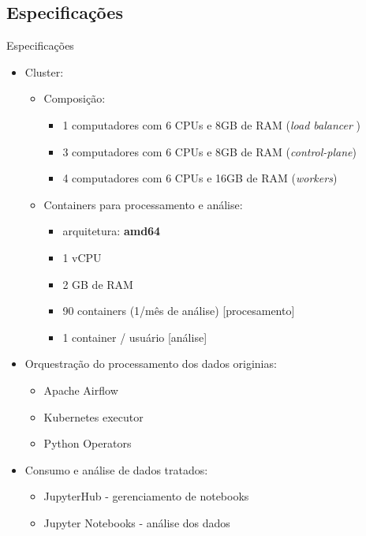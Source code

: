 \documentclass[10pt,brazil]{beamer}
\theoremstyle{definition}
\begin{document}
\subsection{Especificações}

\begin{frame}[allowframebreaks]{Especificações}
      \begin{itemize}
        \item Cluster:
              \begin{itemize}
                \item Composição:
                \begin{itemize}
                    \item 1 computadores com 6 CPUs e 8GB de RAM (\emph{load balancer })
                    \item 3 computadores com 6 CPUs e 8GB de RAM (\emph{control-plane})
                    \item 4 computadores com 6 CPUs e 16GB de RAM (\emph{workers})
                \end{itemize}
              \end{itemize}
        \begin{itemize}
            \item Containers para processamento e análise:
              \begin{itemize}
              \item  arquitetura: \textbf{amd64}
                \item 1 vCPU
                \item 2 GB de RAM
                \item 90 containers (1/mês de análise) [procesamento]
                \item 1 container /  usuário [análise]
              \end{itemize}
        \end{itemize}
    \end{itemize}
    
  \framebreak
  
      \begin{itemize}
        \item Orquestração do processamento dos dados originias:
              \begin{itemize}
                \item Apache Airflow\textregistered\
                \item Kubernetes executor
                \item Python Operators
              \end{itemize}
        \item Consumo e análise de dados tratados:
              \begin{itemize}
                \item JupyterHub - gerenciamento de notebooks
                \item Jupyter Notebooks - análise dos dados
              \end{itemize}
      \end{itemize}
  
  
\end{frame}
\end{document}
